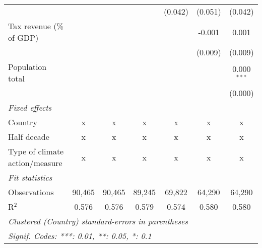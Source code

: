 \begin{tabular}{lcccccc}
                                                      &         &               &               & (0.042)       & (0.051)       & (0.042)\\   
   Tax revenue (\% of GDP)                            &         &               &               &               & -0.001        & 0.001\\   
                                                      &         &               &               &               & (0.009)       & (0.009)\\   
   Population total                                   &         &               &               &               &               & 0.000$^{***}$\\   
                                                      &         &               &               &               &               & (0.000)\\   
   \emph{Fixed effects}\\
   Country                                            & x       & x             & x             & x             & x             & x\\  
   Half decade                                        & x       & x             & x             & x             & x             & x\\  
   Type of climate action/measure                     & x       & x             & x             & x             & x             & x\\  
   \midrule \emph{Fit statistics}\\
   Observations                                       & 90,465  & 90,465        & 89,245        & 69,822        & 64,290        & 64,290\\  
   R$^2$                                              & 0.576   & 0.576         & 0.579         & 0.574         & 0.580         & 0.580\\  
   \midrule
   \multicolumn{7}{l}{\emph{Clustered (Country) standard-errors in parentheses}}\\
   \multicolumn{7}{l}{\emph{Signif. Codes: ***: 0.01, **: 0.05, *: 0.1}}\\
\end{tabular}
\par\endgroup


